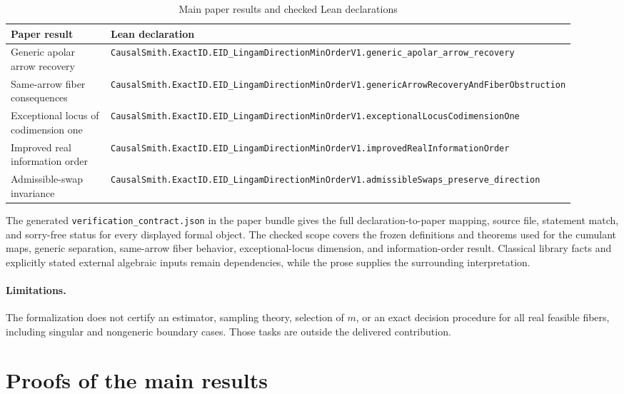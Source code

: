 \documentclass[11pt]{article}
\begin{document}
\begin{table}[ht]
\centering
\scriptsize
\caption{Main paper results and checked Lean declarations}
\begin{tabular}{p{0.30\linewidth}p{0.62\linewidth}}
\hline
Paper result & Lean declaration \\
\hline
Generic apolar arrow recovery &
\texttt{CausalSmith.ExactID.EID\_LingamDirectionMinOrderV1.generic\_apolar\_arrow\_recovery} \\
Same-arrow fiber consequences &
\texttt{CausalSmith.ExactID.EID\_LingamDirectionMinOrderV1.genericArrowRecoveryAndFiberObstruction} \\
Exceptional locus of codimension one &
\texttt{CausalSmith.ExactID.EID\_LingamDirectionMinOrderV1.exceptionalLocusCodimensionOne} \\
Improved real information order &
\texttt{CausalSmith.ExactID.EID\_LingamDirectionMinOrderV1.improvedRealInformationOrder} \\
Admissible-swap invariance &
\texttt{CausalSmith.ExactID.EID\_LingamDirectionMinOrderV1.admissibleSwaps\_preserve\_direction} \\
\hline
\end{tabular}
\end{table}

The generated \texttt{verification\_contract.json} in the paper bundle gives the full declaration-to-paper mapping, source file, statement match, and sorry-free status for every displayed formal object. The checked scope covers the frozen definitions and theorems used for the cumulant maps, generic separation, same-arrow fiber behavior, exceptional-locus dimension, and information-order result. Classical library facts and explicitly stated external algebraic inputs remain dependencies, while the prose supplies the surrounding interpretation.

\paragraph{Limitations.}
The formalization does not certify an estimator, sampling theory, selection of \(m\), or an exact decision procedure for all real feasible fibers, including singular and nongeneric boundary cases. Those tasks are outside the delivered contribution.


\section{Proofs of the main results}\label{sec:deferred-proofs}
\end{document}
